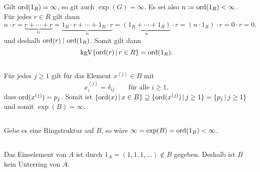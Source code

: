 \subsection{}

Gilt $\operatorname{ord}(1_R) = \infty$, so git auch $\exp(G) = \infty$.
Es sei also $n \coloneqq \operatorname{ord}(1_R) < \infty$.
Für jedes $r \in R$ gilt dann
\[
    n \cdot r
  = \underbrace{r + \dotsb + r}_{n}
  = \underbrace{ 1_R \cdot r + \dotsb + 1_R \cdot r }_{n}
  = \underbrace{(1_R + \dotsb + 1_R)}_{n} \cdot r
  = (n \cdot 1_R) \cdot r
  = 0 \cdot r
  = 0,
\]
und deshalb $\operatorname{ord}(r) \mathrel{|} \operatorname{ord}(1_R)$.
Somit gilt dann
\[
    \kgV \{\ord r \suchthat r \in R\}
  = \ord{1_R}.
\]





\subsection{}

Für jedes $j \geq 1$ gilt für das Element $x^{(j)} \in B$ mit
\[
    x^{(j)}_i
  = \delta_{ij}
  \qquad
  \text{für alle $i \geq 1$},
\]
dass $\operatorname{ord}( x^{(j)} ) = p_j$.
Somit ist $\{ \ord{x} \suchthat x \in B \} \supseteq \{ \ord{ x^{(j)} } \suchthat j \geq 1 \} = \{ p_j \suchthat j \geq 1\}$ und somit $\exp(B) = \infty$.





\subsection{}

Gebe es eine Ringstruktur auf $B$, so wäre $\infty = \exp(B) = \operatorname{ord}(1_B) < \infty$.





\subsection{}

Das Einselement von $A$ ist durch $1_A = (1, 1, 1, \dotsc) \notin B$ gegeben.
Deshalb ist $B$ kein Unterring von $A$.




